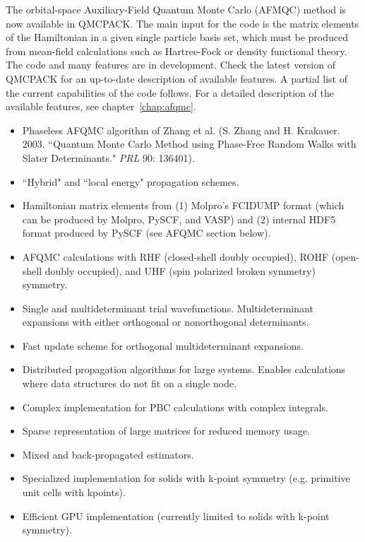 The orbital-space Auxiliary-Field Quantum Monte Carlo (AFMQC) method is now available in QMCPACK. The main input for the code is the matrix elements of the Hamiltonian in a given single particle basis set, which must be produced from mean-field calculations such as Hartree-Fock or density functional theory. The code and many features are in development. Check the latest version of QMCPACK for an up-to-date description of available features. A partial list of the current capabilities of the code follows. For a detailed description of the available features, see chapter~\ref{chap:afqmc}.
 
\begin{itemize}
    \item Phaseless AFQMC algorithm of Zhang et al. (S. Zhang and H. Krakauer. 2003. ``Quantum Monte Carlo Method using Phase-Free Random Walks with Slater Determinants." \textit{PRL} 90: 136401).
    \item ``Hybrid" and ``local energy" propagation schemes.
    \item Hamiltonian matrix elements from (1) Molpro's FCIDUMP format (which can be produced by Molpro, PySCF, and VASP) and (2) internal HDF5 format produced by PySCF (see AFQMC section below).
    \item AFQMC calculations with RHF (closed-shell doubly occupied), ROHF (open-shell doubly occupied), and UHF (spin polarized broken symmetry) symmetry. 
    \item Single and multideterminant trial wavefunctions. Multideterminant expansions with either orthogonal or nonorthogonal determinants. 
    \item Fast update scheme for orthogonal multideterminant expansions.
    \item Distributed propagation algorithms for large systems. Enables calculations where data structures do not fit on a single node.
    \item Complex implementation for PBC calculations with complex integrals.
    \item Sparse representation of large matrices for reduced memory usage.
    \item Mixed and back-propagated estimators.   
    \item Specialized implementation for solids with k-point symmetry (e.g. primitive unit cells with kpoints).
    \item Efficient GPU implementation (currently limited to solids with k-point symmetry).
\end{itemize}

